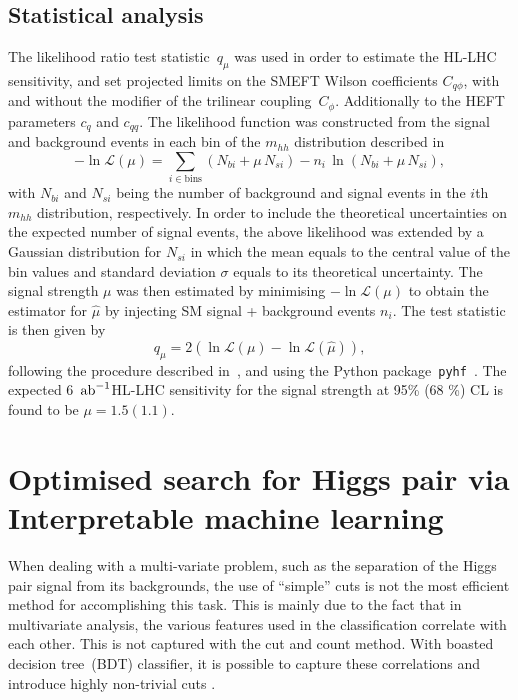\subsection{Statistical analysis}
The likelihood ratio test statistic~$q_\mu$ was used  in order to estimate the HL-LHC sensitivity, and set projected limits on the SMEFT Wilson coefficients $C_{q\phi}$, with and without the modifier of the trilinear coupling~$C_\phi$. Additionally to the HEFT parameters $c_q$ and $c_{qq}$. The likelihood function was constructed from the signal and background events in each bin of the $m_{hh}$ distribution described in ~\cite{Azatov:2015oxa} 
\begin{equation} \label{loglik}
	- \ln \mathscr L (\mu) = \sum_{i \in \mathrm{bins}} (N_{bi} + \mu\, N_{si}) - n_i\, \ln(N_{bi} + \mu\, N_{si}),
\end{equation}
with  $N_{bi}$ and $N_{si}$ being the number of background  and signal events in the $i$th $ m_{hh}$ distribution, respectively. In order to include the theoretical uncertainties on the expected number of signal events, the above likelihood was extended by a Gaussian distribution for $N_{si}$ in which the mean equals to the central value of the bin values and standard deviation $\sigma$ equals to its theoretical uncertainty.
The signal strength $ \mu$ was then estimated by minimising $- \ln \mathscr L (\mu)$ to obtain the estimator for $\hat \mu$ by injecting SM signal + background events $n_i$. The test statistic is then given by
\begin{equation}
	q_\mu = 2 (\ln \mathscr L (\mu)- \ln \mathscr L ( \hat \mu) ),
\end{equation}
following the procedure described in~\cite{Cowan:2010js}, and using the Python package~\texttt{pyhf}~\cite{pyhf,pyhf_joss}.
The expected  6 $\,{\rm ab}^{-1}$HL-LHC sensitivity for the signal strength  at 95\% (68 \%) CL is found to be $\mu  = 1.5 (1.1)$.
\section{Optimised search for Higgs pair via Interpretable machine learning \label{sec:mlanalysisly}}
When dealing with a multi-variate problem, such as the separation of the Higgs pair signal from its backgrounds, the use of ``simple'' cuts is not the most efficient method for accomplishing this task. This is mainly due to the fact that in multivariate analysis, the various features used in the classification correlate with each other. This is not captured with the cut and count method. With boasted decision tree~(BDT) classifier, it is possible to capture these correlations and introduce highly non-trivial cuts .
